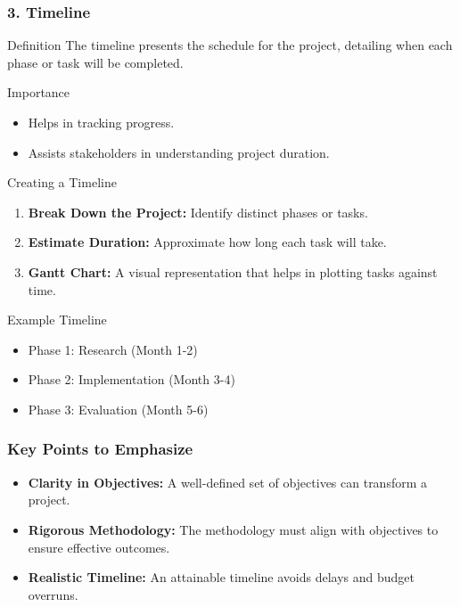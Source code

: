 \documentclass[aspectratio=169]{beamer}
\begin{document}
\begin{frame}[fragile]
    \frametitle{3. Timeline}
    \begin{block}{Definition}
        The timeline presents the schedule for the project, detailing when each phase or task will be completed.
    \end{block}
    
    \begin{block}{Importance}
        \begin{itemize}
            \item Helps in tracking progress.
            \item Assists stakeholders in understanding project duration.
        \end{itemize}
    \end{block}
    
    \begin{block}{Creating a Timeline}
        \begin{enumerate}
            \item \textbf{Break Down the Project:} Identify distinct phases or tasks.
            \item \textbf{Estimate Duration:} Approximate how long each task will take.
            \item \textbf{Gantt Chart:} A visual representation that helps in plotting tasks against time.
        \end{enumerate}
    \end{block}
    
    \begin{block}{Example Timeline}
        \begin{itemize}
            \item Phase 1: Research (Month 1-2)
            \item Phase 2: Implementation (Month 3-4)
            \item Phase 3: Evaluation (Month 5-6)
        \end{itemize}
    \end{block}
\end{frame}

\begin{frame}[fragile]
    \frametitle{Key Points to Emphasize}
    \begin{itemize}
        \item \textbf{Clarity in Objectives:} A well-defined set of objectives can transform a project.
        \item \textbf{Rigorous Methodology:} The methodology must align with objectives to ensure effective outcomes.
        \item \textbf{Realistic Timeline:} An attainable timeline avoids delays and budget overruns.
    \end{itemize}
\end{frame}
\end{document}
